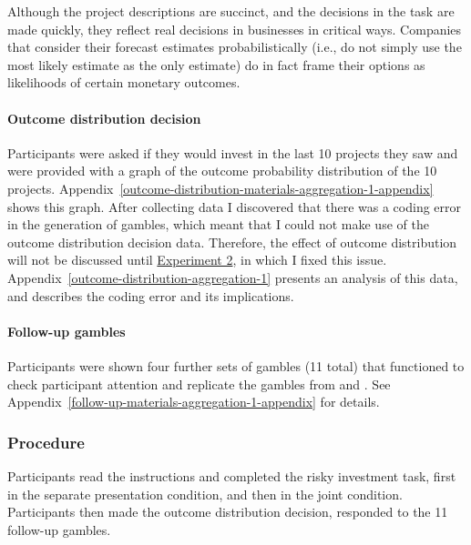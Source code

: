\documentclass[a4paper, nobind, dvipsnames]{templates/ociamthesis}
\theoremstyle{definition}
\theoremstyle{definition}
\theoremstyle{definition}
\theoremstyle{definition}
\theoremstyle{remark}
\begin{document}
Although the project descriptions are succinct, and the decisions in the task
are made quickly, they reflect real decisions in businesses in critical ways.
Companies that consider their forecast estimates probabilistically (i.e., do not
simply use the most likely estimate as the only estimate) do in fact frame their
options as likelihoods of certain monetary outcomes.

\hypertarget{outcome-distribution-materials-aggregation-1}{%
\paragraph{Outcome distribution decision}\label{outcome-distribution-materials-aggregation-1}}

Participants were asked if they would invest in the last 10 projects they saw
and were provided with a graph of the outcome probability distribution of the 10
projects. Appendix~\ref{outcome-distribution-materials-aggregation-1-appendix}
shows this graph. After collecting data I discovered that there was a coding
error in the generation of gambles, which meant that I could not make use of the
outcome distribution decision data. Therefore, the effect of outcome
distribution will not be discussed until \protect\hyperlink{aggregation-2}{Experiment 2}, in
which I fixed this issue. Appendix~\ref{outcome-distribution-aggregation-1}
presents an analysis of this data, and describes the coding error and its
implications.

\hypertarget{follow-up-gambles}{%
\paragraph{Follow-up gambles}\label{follow-up-gambles}}

Participants were shown four further sets of gambles (11 total) that functioned
to check participant attention and replicate the gambles from \textcite{samuelson1963} and
\textcite{redelmeier1992}. See Appendix~\ref{follow-up-materials-aggregation-1-appendix}
for details.

\hypertarget{procedure}{%
\subsubsection{Procedure}\label{procedure}}

Participants read the instructions and completed the risky investment task,
first in the separate presentation condition, and then in the joint condition.
Participants then made the outcome distribution decision, responded to the 11
follow-up gambles.
\end{document}
